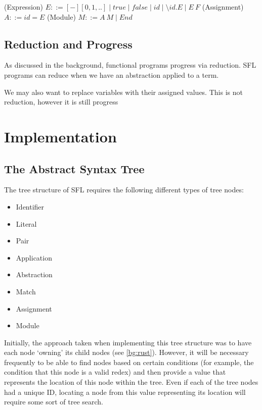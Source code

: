 \begin{syntax}
(Expression) \(E ::= [-][0, 1, ..] \mid true \mid false \mid id \mid \setminus id. E \mid E\:F\)\newline
(Assignment) \(A ::= id = E\)\newline
(Module) \(M ::= A\: M \mid End\)
\end{syntax}

\subsection{Reduction and Progress}
As discussed in the background, functional programs progress via reduction. SFL programs can reduce when we have an abstraction applied to a term. 

We may also want to replace variables with their assigned values. This is not reduction, however it is still progress



\section{Implementation}
\subsection{The Abstract Syntax Tree}
The tree structure of \ac{SFL} requires the following different types of tree nodes:
\begin{itemize}
    \item Identifier
    \item Literal
    \item Pair
    \item Application
    \item Abstraction
    \item Match
    \item Assignment
    \item Module
\end{itemize}
Initially, the approach taken when implementing this tree structure was to have each node `owning' its child nodes (see \ref{bg:rust}). However, it will be necessary frequently to be able to find nodes based on certain conditions (for example, the condition that this node is a valid redex) and then provide a value that represents the location of this node within the tree. Even if each of the tree nodes had a unique ID, locating a node from this value representing its location will require some sort of tree search.

